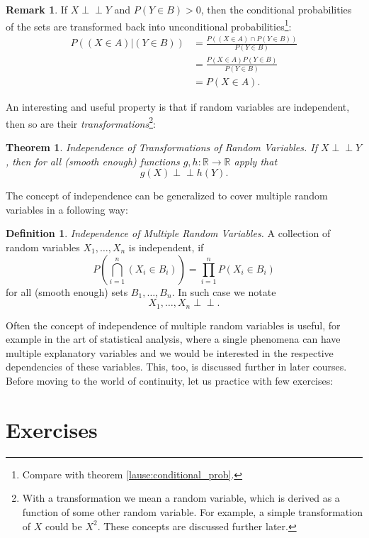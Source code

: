 \documentclass[12pt,a4paper,leqno]{report}
\newcommand{\R}{\mathbb{R}}
\def\independent{\perp\!\!\!\perp}
\theoremstyle{plain}
\newtheorem{lause}[equation]{Theorem}
\theoremstyle{definition}
\newtheorem{maar}[equation]{Definition}
\newtheorem{remark}[equation]{Remark}
\begin{document}
\begin{remark}
If $X \independent Y$ and $P(Y \in B) > 0$, then the conditional probabilities of the sets are transformed back into unconditional probabilities\footnote{Compare with theorem \ref{lause:conditional_prob}.}:
\[
\begin{split}
P((X \in A) | (Y \in B)) &= \frac{P((X \in A) \cap P(Y \in B))}{P(Y \in B)} \\
 & = \frac{P(X \in A)P(Y \in B)}{P(Y \in B)} \\
 &= P(X \in A).
\end{split}
\]	
\end{remark}

An interesting and useful property is that if random variables are independent, then so are their \emph{transformations}\footnote{With a transformation we mean a random variable, which is derived as a function of some other random variable. For example, a simple transformation of $X$ could be $X^2$. These concepts are discussed further later.}:

\begin{lause}
\emph{Independence of Transformations of Random Variables}.  If $X \independent Y$, then for all (smooth enough) functions $g,h : \R \rightarrow \R$ apply that
\[
g(X) \independent  h(Y).
\]
\end{lause}

The concept of independence can be generalized to cover multiple random variables in a following way:
\begin{maar}
\emph{Independence of Multiple Random Variables.}  A collection of random variables $X_1, \dots, X_n$ is independent, if
\[
P\left(\bigcap_{i=1}^n (X_i \in B_i) \right) = \prod_{i=1}^n P(X_i \in B_i)
\]
for all (smooth enough) sets $B_1, \dots , B_n$. In such case we notate 
\[
X_1, \dots , X_n \independent.
\]
\end{maar}

Often the concept of independence of multiple random variables is useful, for example in the art of statistical analysis, where a single phenomena can have multiple explanatory variables and we would be interested in the respective dependencies of these variables. This, too, is discussed further in later courses. Before moving to the world of continuity, let us practice with few exercises:

\section{Exercises}
\end{document}
